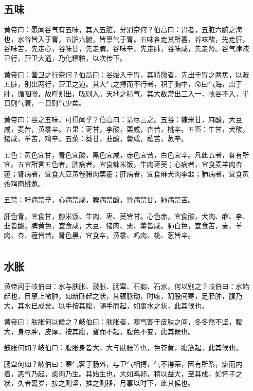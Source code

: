 \documentclass[12pt,UTF8]{ctexbook}
\begin{document}
	\chapter{五味}
	
	黄帝曰：愿闻谷气有五味，其入五脏，分别奈何？伯高曰：胃者，五脏六腑之海也，水谷皆入于胃，五脏六腑，皆禀气于胃。五味各走其所喜，谷味酸，先走肝，谷味苦，先走心，谷味甘，先走脾，谷味辛，先走肺，谷味咸，先走肾。谷气津液已行，营卫大通，乃化糟粕，以次传下。
	
	黄帝曰：营卫之行奈何？伯高曰：谷始入于胃，其精微者，先出于胃之两焦，以溉五脏，别出两行，营卫之道。其大气之搏而不行者，积于胸中，命曰气海，出于肺，循咽喉，故呼则出，吸则入。天地之精气，其大数常出三入一，故谷不入，半日则气衰，一日则气少矣。
	
	黄帝曰：谷之五味，可得闻乎？伯高曰：请尽言之。五谷：糠米甘，麻酸，大豆咸，麦苦，黄黍辛。五果：枣甘，李酸，栗咸，杏苦，桃辛。五畜：牛甘，犬酸，猪咸，羊苦，鸡辛。五菜：葵甘，韭酸，藿咸，薤苦，葱辛。
	
	五色：黄色宜甘，青色宜酸，黑色宜咸，赤色宜苦，白色宜辛。凡此五者，各有所宜。五宜所言五色者，脾病者，宜食糠米饭，牛肉枣葵；心病者，宜食麦羊肉杏薤；肾病者，宜食大豆黄卷猪肉栗藿；肝病者，宜食麻犬肉李韭；肺病者，宜食黄黍鸡肉桃葱。
	
	五禁：肝病禁辛，心病禁咸，脾病禁酸，肾病禁甘，肺病禁苦。
	
	肝色青，宜食甘，糠米饭、牛肉、枣、葵皆甘。心色赤，宜食酸，犬肉、麻、李、韭皆酸。脾黄色，宜食咸，大豆、猪肉、栗、藿皆咸。肺白色，宜食苦，麦、羊肉、杏、薤皆苦。肾色黑，宜食辛，黄黍、鸡肉、桃、葱皆辛。
	
	\part{}
	\chapter{水胀}
	
	黄帝问于岐伯曰：水与肤胀、鼓胀、肠覃、石瘕、石水，何以别之？岐伯曰：水始起也，目窠上微肿，如新卧起之状，其颈脉动，时咳，阴股间寒，足胫肿，腹乃大，其水已成矣。以手按其腹，随手而起，如裹水之状，此其候也。
	
	黄帝曰：肤胀何以候之？岐伯曰：肤胀者，寒气客于皮肤之间，冬冬然不坚，腹大，身尽肿，皮厚，按其腹，窅而不起，腹色不变，此其候也。
	
	鼓胀何如？岐伯曰：腹胀身皆大，大与肤胀等也，色苍黄，腹筋起，此其候也。
	
	肠覃何如？岐伯曰：寒气客于肠外，与卫气相搏，气不得荣，因有所系，癖而内着，恶气乃起，瘜肉乃生。其始生也，大如鸡卵，稍以益大，至其成，如怀子之状，久者离岁，按之则坚，推之则移，月事以时下，此其候也。
	
\end{document}
